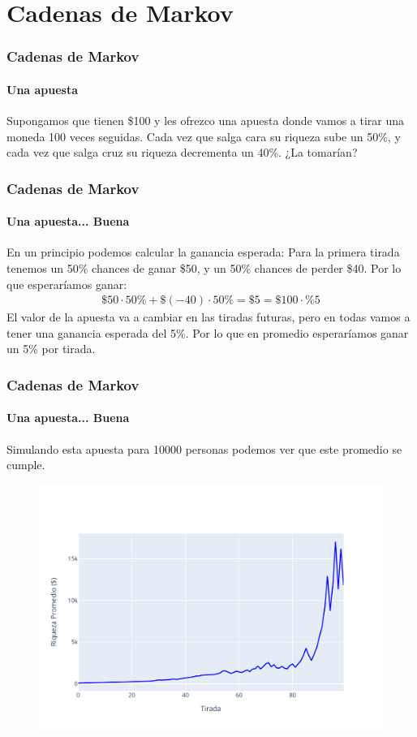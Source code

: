 \documentclass{beamer}
\begin{document}
\newcommand{\SECTIONC}{Cadenas de Markov}
\section{\SECTIONC}

\begin{frame}
  \frametitle{\SECTIONC}
  \framesubtitle{Una apuesta}

  Supongamos que tienen \$100 y les ofrezco una apuesta donde vamos a tirar una moneda 100 veces seguidas. Cada vez que salga cara su riqueza sube un 50\%, y cada vez que salga cruz su riqueza decrementa un 40\%. ¿La tomarían?
\end{frame}

\begin{frame}
  \frametitle{\SECTIONC}
  \framesubtitle{Una apuesta... Buena}

  En un principio podemos calcular la ganancia esperada: Para la primera tirada tenemos un 50\% chances de ganar \$50, y un 50\% chances de perder \$40. Por lo que esperaríamos ganar:
  \begin{gather*}
    \$50 \cdot 50\% + \$(-40) \cdot 50\% = \$5 = \$100 \cdot \%5
  \end{gather*}
  \pause El valor de la apuesta va a cambiar en las tiradas futuras, pero en todas vamos a tener una ganancia esperada del 5\%. Por lo que en promedio esperaríamos ganar un 5\% por tirada.
\end{frame}

\begin{frame}
  \frametitle{\SECTIONC}
  \framesubtitle{Una apuesta... Buena}

  Simulando esta apuesta para 10000 personas podemos ver que este promedio se cumple.

  \begin{figure}[H]
    \centering
    \includegraphics[scale=0.5]{img/mean.pdf}
  \end{figure}
\end{frame}
\end{document}
